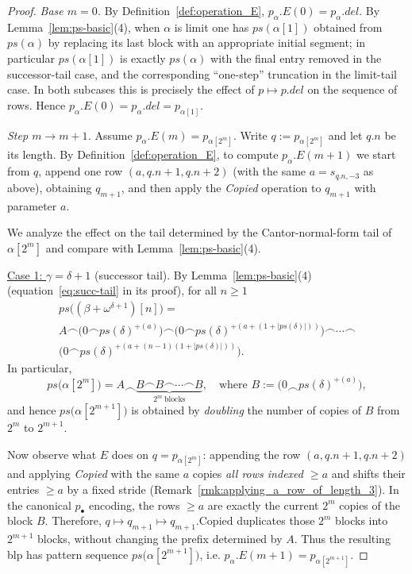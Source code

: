 \documentclass[10pt,a4paper]{amsart}
\begin{document}
\begin{proof}
\emph{Base $m=0$.}
By Definition~\ref{def:operation_E}, $p_\alpha.E(0)=p_\alpha.del$.
By Lemma~\ref{lem:ps-basic}(4), when $\alpha$ is limit one has
\(
ps(\alpha[1])
\)
obtained from $ps(\alpha)$ by replacing its last block with an appropriate initial
segment; in particular $ps(\alpha[1])$ is exactly $ps(\alpha)$ with the final entry
removed in the successor-tail case, and the corresponding ``one-step'' truncation in
the limit-tail case. In both subcases this is precisely the effect of $p\mapsto p.del$
on the sequence of rows. Hence $p_\alpha.E(0)=p_\alpha.del=p_{\alpha[1]}$.

\emph{Step $m\to m+1$.}
Assume $p_\alpha.E(m)=p_{\alpha[2^m]}$. Write $q:=p_{\alpha[2^m]}$ and let
$q.n$ be its length. By Definition~\ref{def:operation_E}, to compute $p_\alpha.E(m+1)$
we start from $q$, append one row $(a,q.n+1,q.n+2)$ (with the same $a=s_{q.n,-3}$ as
above), obtaining $q_{m+1}$, and then apply the \textit{Copied} operation to $q_{m+1}$
with parameter $a$.

We analyze the effect on the tail determined by the Cantor-normal-form tail of
$\alpha[2^m]$ and compare with Lemma~\ref{lem:ps-basic}(4).

\underline{Case 1: } $\gamma=\delta+1$ (successor tail).
By Lemma~\ref{lem:ps-basic}(4) (equation~\eqref{eq:succ-tail} in its proof), for all $n\ge1$
\begin{multline*}
  ps\!\bigl((\beta+\omega^{\delta+1})[n]\bigr)
= \\ A \frown \bigl(0\frown ps(\delta)^{+(a)}\bigr)
      \frown \bigl(0\frown ps(\delta)^{+(a+(1+|ps(\delta)|))}\bigr)
      \frown \cdots \frown \\ 
      \bigl(0\frown ps(\delta)^{+(a+(n-1)(1+|ps(\delta)|))}\bigr).
\end{multline*}
In particular,
\[
ps\!\bigl(\alpha[2^m]\bigr)=A\frown \underbrace{B \frown B \frown\cdots \frown B}_{2^m\ \text{blocks}},
\quad\text{where }B:=\bigl(0\frown ps(\delta)^{+(a)}\bigr),
\]
and hence $ps\!\bigl(\alpha[2^{m+1}]\bigr)$ is obtained by \emph{doubling} the number
of copies of $B$ from $2^m$ to $2^{m+1}$.

Now observe what $E$ does on $q=p_{\alpha[2^m]}$:
appending the row $(a,q.n+1,q.n+2)$ and applying \textit{Copied} with the same $a$
copies \emph{all rows indexed $\ge a$} and shifts their entries $\ge a$ by a fixed
stride (Remark~\ref{rmk:applying_a_row_of_length_3}). In the canonical $p_\bullet$
encoding, the rows $\ge a$ are exactly the current $2^m$ copies of the block $B$.
Therefore, $q\mapsto q_{m+1}\mapsto q_{m+1}.\mathrm{Copied}$ duplicates those $2^m$
blocks into $2^{m+1}$ blocks, without changing the prefix determined by $A$.
Thus the resulting blp has pattern sequence $ps\!\bigl(\alpha[2^{m+1}]\bigr)$, i.e.
$p_\alpha.E(m+1)=p_{\alpha[2^{m+1}]}$.


\end{proof}
\end{document}
